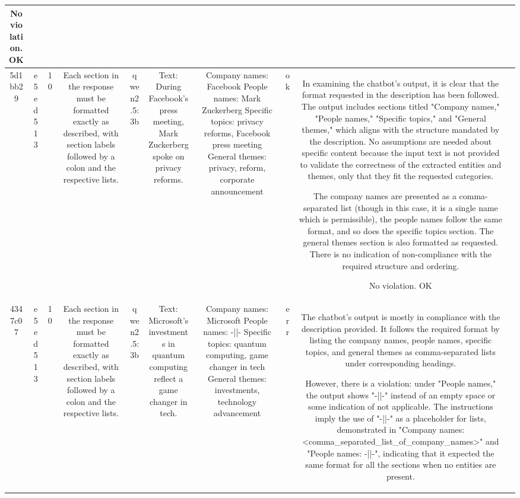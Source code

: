\begin{table}[h!]
\begin{tabular}{|c|c|c|c|c|c|c|c|c|c|}
No violation.
OK & \\
\hline
5d1bb29 & e5ed513 & 10 & Each section in the response must be formatted exactly as described, with section labels followed by a colon and the respective lists. & qwen2.5:3b & Text: During Facebook's press meeting, Mark Zuckerberg spoke on privacy reforms. & Company names: Facebook
People names: Mark Zuckerberg
Specific topics: privacy reforms, Facebook press meeting
General themes: privacy, reform, corporate announcement & ok & In examining the chatbot's output, it is clear that the format requested in the description has been followed. The output includes sections titled "Company names," "People names," "Specific topics," and "General themes," which aligns with the structure mandated by the description. No assumptions are needed about specific content because the input text is not provided to validate the correctness of the extracted entities and themes, only that they fit the requested categories.

The company names are presented as a comma-separated list (though in this case, it is a single name which is permissible), the people names follow the same format, and so does the specific topics section. The general themes section is also formatted as requested. There is no indication of non-compliance with the required structure and ordering.

No violation.
OK & \\
\hline
4347c07 & e5ed513 & 10 & Each section in the response must be formatted exactly as described, with section labels followed by a colon and the respective lists. & qwen2.5:3b & Text: Microsoft's investments in quantum computing reflect a game changer in tech. & Company names: Microsoft
People names: -||-
Specific topics: quantum computing, game changer in tech
General themes: investments, technology advancement & err & The chatbot's output is mostly in compliance with the description provided. It follows the required format by listing the company names, people names, specific topics, and general themes as comma-separated lists under corresponding headings.

However, there is a violation: under "People names," the output shows "-||-" instead of an empty space or some indication of not applicable. The instructions imply the use of "-||-" as a placeholder for lists, demonstrated in "Company names: <comma_separated_list_of_company_names>" and "People names: -||-", indicating that it expected the same format for all the sections when no entities are present.


\end{tabular}
\end{table}
